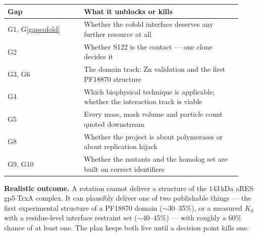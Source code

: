 \documentclass[11pt,a4paper]{article}
\begin{document}
\begin{longtable}{@{}p{0.30\linewidth}p{0.62\linewidth}@{}}
\toprule
\textbf{Gap} & \textbf{What it unblocks or kills}\\
\midrule
\endhead
G1, G\ref{gapcofold} & Whether the cofold interface deserves any further resource at all\\
G2 & Whether S122 is the contact --- one clone decides it\\
G3, G6 & The domain track: Zn validation and the first PF18870 structure\\
G4 & Which biophysical technique is applicable; whether the interaction track is viable\\
G5 & Every mass, mask volume and particle count quoted downstream\\
G8 & Whether the project is about polymerases or about replication hijack\\
G9, G10 & Whether the mutants and the homolog set are built on correct identifiers\\
\bottomrule
\end{longtable}

\medskip
\noindent
\textbf{Realistic outcome.} A rotation cannot deliver a structure of the 143\,kDa
aRES$\cdot$gp5$\cdot$TrxA complex. It can plausibly deliver one of two publishable things --- the
first experimental structure of a PF18870 domain ($\sim$30--35\%), or a measured $K_d$ with a
residue-level interface restraint set ($\sim$40--45\%) --- with roughly a 60\% chance of at least
one. The plan keeps both live until a decision point kills one.
\end{document}
